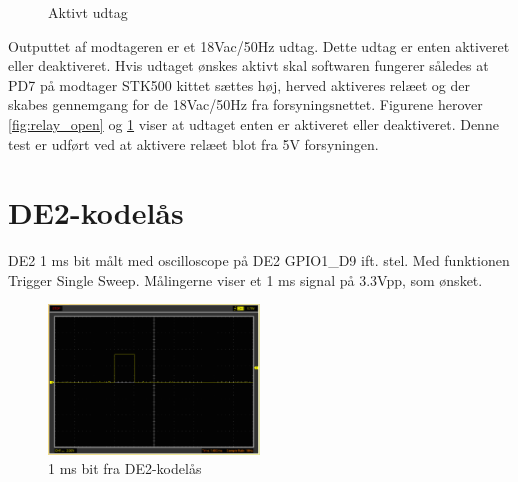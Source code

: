 \begin{figure}[htb]
\begin{minipage}{0.45\textwidth}
		\caption{Aktivt udtag}
	\label{fig:relay_closed}
  \end{minipage}
\end{figure}

Outputtet af modtageren er et 18Vac/50Hz udtag. Dette udtag er enten aktiveret eller deaktiveret. Hvis udtaget ønskes aktivt skal softwaren fungerer således at PD7 på modtager STK500 kittet sættes høj, herved aktiveres relæet og der skabes gennemgang for de 18Vac/50Hz fra forsyningsnettet. Figurene herover \ref{fig:relay_open} og \ref{fig:relay_closed} viser at udtaget enten er aktiveret eller deaktiveret. Denne test er udført ved at aktivere relæet blot fra 5V forsyningen.

\section{DE2-kodelås}

DE2 1 ms bit målt med oscilloscope på DE2 GPIO1\_D9 ift. stel. Med funktionen Trigger Single Sweep. Målingerne viser et 1 ms signal på 3.3Vpp, som ønsket.

\begin{figure}[H]
	\centering
	\includegraphics[width=0.50\textwidth]{billeder/HWTest/DE2/DE2_1ms_pulse}
	\caption{1 ms bit fra DE2-kodelås}
	\label{code:de2_test}
\end{figure}

\clearpage